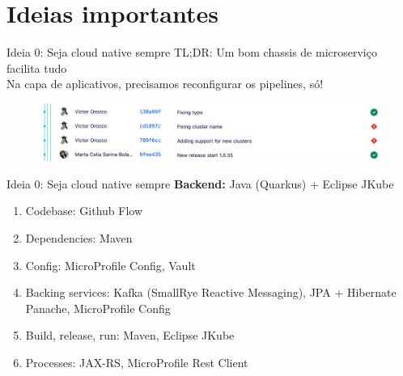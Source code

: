 \documentclass[aspectratio=169]{beamer}
\begin{document}
{
	\section{Ideias importantes}
}

\begin{frame}{Ideia 0: Seja cloud native sempre}
	TL;DR: Um bom chassis de microserviço facilita tudo\\
	
	Na capa de aplicativos, precisamos reconfigurar os pipelines, {\LARGE só!}
	\begin{figure}
		\centering
		\includegraphics[width=\linewidth]{Images/commits}
	\end{figure}
	
	
\end{frame}

\begin{frame}{Ideia 0: Seja cloud native sempre}
\textbf{Backend:} Java (Quarkus) + Eclipse JKube
			\begin{enumerate}
			\item Codebase: Github Flow
			\item Dependencies: Maven
			\item Config: MicroProfile Config, Vault
			\item Backing services: Kafka (SmallRye Reactive Messaging), JPA + Hibernate Panache, MicroProfile Config
			\item Build, release, run: Maven, Eclipse JKube
			\item Processes: JAX-RS, MicroProfile Rest Client
		\end{enumerate}
\end{frame}
\end{document}
